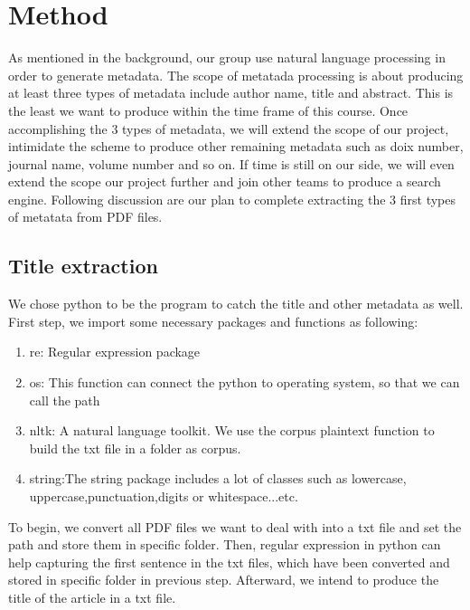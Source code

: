 \section*{Method}
As mentioned in the background, our group use natural language processing in order to generate metadata. 
The scope of metatada processing is about producing at least three types of metadata include author name, title and abstract. 
This is the least we want to produce within the time frame of this course. 
Once accomplishing the 3 types of metadata, we will extend the scope of our project, intimidate the scheme to produce other remaining metadata such as doix number, journal name, volume number and so on. 
If time is still on our side, we will even extend the scope our project further and join other teams to produce a search engine. 
Following discussion are our plan to complete extracting the 3 first types of metatata from PDF files.
\subsection*{Title extraction}
We chose python to be the program to catch the title and other metadata as well. First step, we import some necessary packages and functions as following:
\begin{enumerate}
	\item re: Regular expression package
	\item os: This function can connect the python to operating system, so that we can call the path
	\item nltk: A natural language toolkit. We use the corpus plaintext function to build the txt file in a folder as corpus.
	\item string:The string package includes a lot of classes such as lowercase, uppercase,punctuation,digits or whitespace...etc. 
\end{enumerate}  
To begin, we convert all PDF files we want to deal with into a txt file and set the path and store them in specific folder. 
Then, regular expression in python can help capturing the first sentence in the txt files, which have been converted and stored in specific folder in previous step. 
Afterward, we intend to produce the title of the article in a txt file.   

